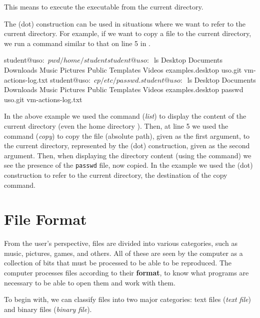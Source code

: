 This means to execute the executable  from the current directory.

The  (dot) construction can be used in situations where we want to refer to the current directory.
For example, if we want to copy a file to the current directory, we run a command similar to that on line 5 in .

\begin{screen}[style=bashstyle][caption={Reference . to current directory},label={lst:data-files:dot}]
student@uso:~$ pwd
/home/student
student@uso:~$ ls
Desktop  Documents  Downloads  Music  Pictures  Public  Templates  Videos  examples.desktop  uso.git  vm-actions-log.txt
student@uso:~$ cp /etc/passwd .
student@uso:~$ ls
Desktop  Documents  Downloads  Music  Pictures  Public  Templates  Videos  examples.desktop  passwd  uso.git  vm-actions-log.txt
\end{screen}

In the above example we used the  command (\textit{list}) to display the content of the current directory (even the home directory ).
Then, at line 5 we used the  command (\textit{copy}) to copy the file  (absolute path), given as the first argument, to the current directory, represented by the  (dot) construction, given as the second argument.
Then, when displaying the directory content (using the  command) we see the presence of the \texttt{passwd} file, now copied.
In the example we used the  (dot) construction to refer to the current directory, the destination of the copy command.

\section{File Format}
\label{sec:data-files:file-format}

From the user's perspective, files are divided into various categories, such as music, pictures, games, and others.
All of these are seen by the computer as a collection of bits that must be processed to be able to be reproduced.
The computer processes files according to their \textbf{format}, to know what programs are necessary to be able to open them and work with them.

To begin with, we can classify files into two major categories: text files (\textit{text file}) and binary files (\textit{binary file}).

